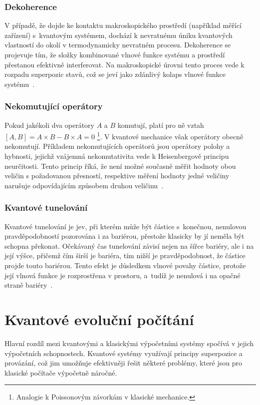 \subsubsection*{Dekoherence}
V případě, že dojde ke kontaktu makroskopického prostředí (například měřící zařízení) s~kvantovým systémem, dochází k nevratnému úniku kvantových vlastností do okolí v termodynamicky nevratném procesu. 
Dekoherence se projevuje tím, že složky kombinované vlnové funkce systému a prostředí přestanou efektivně interferovat.
Na makroskopické úrovni tento proces vede k rozpadu superpozic stavů, což se jeví jako zdánlivý kolaps vlnové funkce systému~\cite{NaturalComputing}.

\subsubsection*{Nekomutující operátory}
Pokud jakékoli dva operátory $A$ a $B$ komutují, platí pro ně vztah $\left[A, B \right] = A \times B - B \times A = 0$\,\,\footnote{Analogie k Poissonovým závorkám v klasické mechanice.}. 
V kvantové mechanice však operátory obecně nekomutují. 
Příkladem nekomutujících operátorů jsou operátory polohy a hybnosti, jejichž vzájemná nekomutativita vede k Heisenbergově principu neurčitosti.
Tento princip říká, že není možné současně měřit hodnoty obou veličin s požadovanou přesností, respektive měření hodnoty jedné veličiny narušuje odpovídajícím způsobem druhou veličinu~\cite{NaturalComputing,QuantumMeasurement}.

\subsubsection*{Kvantové tunelování}
Kvantové tunelování je jev, při kterém může být částice s~konečnou, nenulovou pravděpodobností pozorována i za bariérou, přestože klasicky by jí neměla být schopna překonat. 
Očekávaný čas tunelování závisí nejen na šířce bariéry, ale i na její výšce, přičemž čím širší je bariéra, tím nižší je pravděpodobnost, že částice projde touto bariérou. 
Tento efekt je důsledkem vlnové povahy částice, protože její vlnová funkce je rozprostřena v prostoru, a~tudíž je nenulová i na opačné straně bariéry~\cite{NaturalComputing}. 

\section{Kvantové evoluční počítání}
Hlavní rozdíl mezi kvantovými a klasickými výpočetními systémy spočívá v jejich výpočetních schopnostech.
Kvantové systémy využívají principy superpozice a provázání, což jim umožňuje efektivněji řešit některé problémy, které jsou pro klasické počítače výpočetně náročné. 

